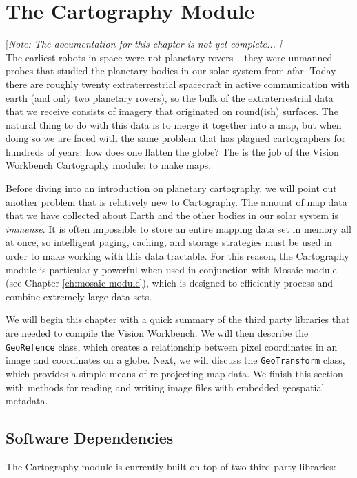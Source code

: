 \chapter{The Cartography Module}\label{ch:cartography-module}

[{\em Note: The documentation for this chapter is not yet complete... ]}
$$
$$ 
The earliest robots in space were not planetary rovers -- they were
unmanned probes that studied the planetary bodies in our solar system
from afar.  Today there are roughly twenty extraterrestrial spacecraft
in active communication with earth (and only two planetary rovers), so
the bulk of the extraterrestrial data that we receive consists of
imagery that originated on round(ish) surfaces.  The natural thing to
do with this data is to merge it together into a map, but when doing
so we are faced with the same problem that has plagued cartographers
for hundreds of years: how does one flatten the globe?  The is the job
of the Vision Workbench Cartography module: to make maps.

Before diving into an introduction on planetary cartography, we will
point out another problem that is relatively new to Cartography.  The
amount of map data that we have collected about Earth and the other
bodies in our solar system is {\em immense}.  It is often impossible
to store an entire mapping data set in memory all at once, so
intelligent paging, caching, and storage strategies must be used in
order to make working with this data tractable.  For this reason, the
Cartography module is particularly powerful when used in conjunction
with Mosaic module (see Chapter \ref{ch:mosaic-module}), which is
designed to efficiently process and combine extremely large data sets.

We will begin this chapter with a quick summary of the third party
libraries that are needed to compile the Vision Workbench.  We will
then describe the \verb#GeoRefence# class, which creates a
relationship between pixel coordinates in an image and coordinates on
a globe.  Next, we will discuss the \verb#GeoTransform# class, which
provides a simple means of re-projecting map data.  We finish this
section with methods for reading and writing image files with embedded
geospatial metadata.

\section{Software Dependencies}

The Cartography module is currently built on top of two third party
libraries:

